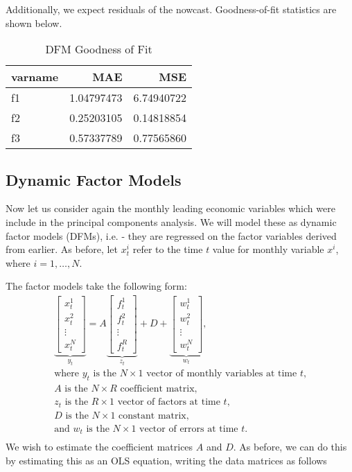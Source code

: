 \documentclass[11pt, letterpaper]{article}\usepackage[]{graphicx}\usepackage[]{color}
\begin{document}
Additionally, we expect residuals of the nowcast. Goodness-of-fit statistics are shown below.
\begin{table}[H]
\centering
\begingroup\footnotesize
\begin{tabular}{lrr}
  \hline
varname & MAE & MSE \\ 
  \hline
f1 & 1.04797473 & 6.74940722 \\ 
  f2 & 0.25203105 & 0.14818854 \\ 
  f3 & 0.57337789 & 0.77565860 \\ 
   \hline
\end{tabular}
\endgroup
\caption{DFM Goodness of Fit} 
\end{table}




\subsection{Dynamic Factor Models}
Now let us consider again the monthly leading economic variables which were include in the principal components analysis. We will model these as dynamic factor models (DFMs), i.e. - they are regressed on the factor variables derived from earlier. As before, let $x^i_t$ refer to the time $t$ value for monthly variable $x^i$, where $i = 1, \dots, N$.

The factor models take the following form:
\begin{align*}
\underbrace{\begin{bmatrix}
	x^1_t\\
	x^2_t\\
	\vdots \\
	x^N_t
\end{bmatrix}}_{y_t}
=
A
\underbrace{\begin{bmatrix}
	f^1_{t}\\
	f^2_{t}\\
	\vdots \\
	f^R_{t}
\end{bmatrix}}_{z_t}
+
D 
+
\underbrace{\begin{bmatrix}
	w^1_t\\
	w^2_t\\
	\vdots\\
	w^N_t
\end{bmatrix}}_{w_t},\\
\text{where $y_t$ is the $N \times 1$ vector of monthly variables at time $t$,}\\
\text{$A$ is the $N \times R$ coefficient matrix,}\\
\text{$z_t$ is the $R \times 1$ vector of factors at time $t$,}\\
\text{$D$ is the $N \times 1$ constant matrix,}\\
\text{and $w_t$ is the $N \times 1$ vector of errors at time $t$.}\\
\end{align*}
We wish to estimate the coefficient matrices $A$ and $D$. As before, we can do this by estimating this as an OLS equation, writing the data matrices as follows
\end{document}
